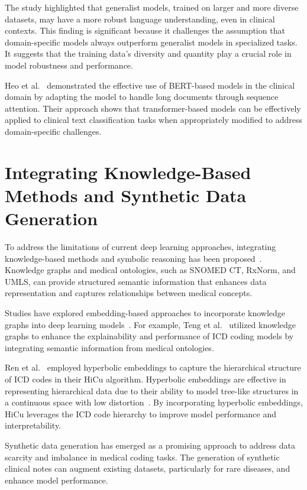 \documentclass[12pt,a4paper]{report}
\begin{document}
The study highlighted that generalist models, trained on larger and more diverse datasets, may have a more robust language understanding, even in clinical contexts. This finding is significant because it challenges the assumption that domain-specific models always outperform generalist models in specialized tasks. It suggests that the training data's diversity and quantity play a crucial role in model robustness and performance.

Heo et al.~\cite{heo2022medical} demonstrated the effective use of BERT-based models in the clinical domain by adapting the model to handle long documents through sequence attention. Their approach shows that transformer-based models can be effectively applied to clinical text classification tasks when appropriately modified to address domain-specific challenges.

\section{Integrating Knowledge-Based Methods and Synthetic Data Generation}

To address the limitations of current deep learning approaches, integrating knowledge-based methods and symbolic reasoning has been proposed~\cite{dong2022automated}. Knowledge graphs and medical ontologies, such as SNOMED CT, RxNorm, and UMLS, can provide structured semantic information that enhances data representation and captures relationships between medical concepts.

Studies have explored embedding-based approaches to incorporate knowledge graphs into deep learning models~\cite{teng2020explainable, xie2019ehr}. For example, Teng et al.~\cite{teng2020explainable} utilized knowledge graphs to enhance the explainability and performance of ICD coding models by integrating semantic information from medical ontologies.

Ren et al.~\cite{ren2022hicu} employed hyperbolic embeddings to capture the hierarchical structure of ICD codes in their HiCu algorithm. Hyperbolic embeddings are effective in representing hierarchical data due to their ability to model tree-like structures in a continuous space with low distortion~\cite{nickel2017poincare}. By incorporating hyperbolic embeddings, HiCu leverages the ICD code hierarchy to improve model performance and interpretability.

Synthetic data generation has emerged as a promising approach to address data scarcity and imbalance in medical coding tasks. The generation of synthetic clinical notes can augment existing datasets, particularly for rare diseases, and enhance model performance.
\end{document}
